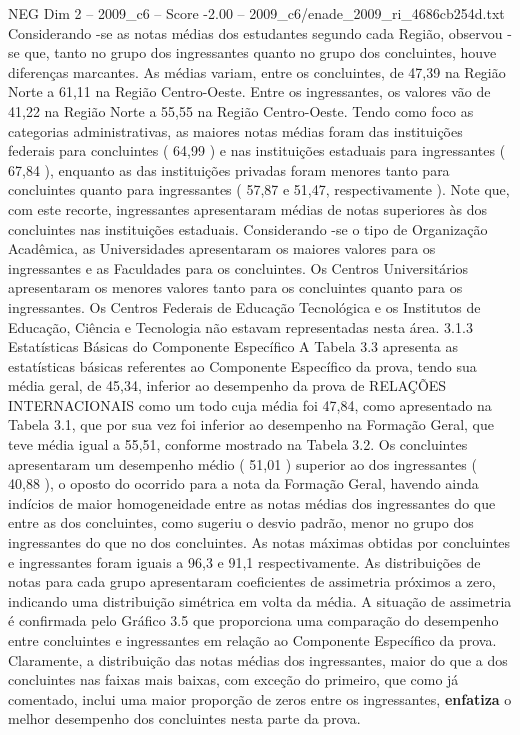 \begin{textsample}{NEG Dim 2 – 2009\_c6 – Score -2.00 – 2009\_c6/enade\_2009\_ri\_4686cb254d.txt}
Considerando -se as notas médias dos estudantes segundo cada Região, observou -se que, tanto no grupo dos ingressantes quanto no grupo dos concluintes, houve diferenças marcantes.
As médias variam, entre os concluintes, de 47,39 na Região Norte a 61,11 na Região Centro-Oeste.
Entre os ingressantes, os valores vão de 41,22 na Região Norte a 55,55 na Região Centro-Oeste.
Tendo como foco as categorias administrativas, as maiores notas médias foram das instituições federais para concluintes ( 64,99 ) e nas instituições estaduais para ingressantes ( 67,84 ), enquanto as das instituições privadas foram menores tanto para concluintes quanto para ingressantes ( 57,87 e 51,47, respectivamente ).
Note que, com este recorte, ingressantes apresentaram médias de notas superiores às dos concluintes nas instituições estaduais.
Considerando -se o tipo de Organização Acadêmica, as Universidades apresentaram os maiores valores para os ingressantes e as Faculdades para os concluintes.
Os Centros Universitários apresentaram os menores valores tanto para os concluintes quanto para os ingressantes.
Os Centros Federais de Educação Tecnológica e os Institutos de Educação, Ciência e Tecnologia não estavam representadas nesta área. 3.1.3 Estatísticas Básicas do Componente Específico A Tabela 3.3 apresenta as estatísticas básicas referentes ao Componente Específico da prova, tendo sua média geral, de 45,34, inferior ao desempenho da prova de RELAÇÕES INTERNACIONAIS como um todo cuja média foi 47,84, como apresentado na Tabela 3.1, que por sua vez foi inferior ao desempenho na Formação Geral, que teve média igual a 55,51, conforme mostrado na Tabela 3.2.
Os concluintes apresentaram um desempenho médio ( 51,01 ) superior ao dos ingressantes ( 40,88 ), o oposto do ocorrido para a nota da Formação Geral, havendo ainda indícios de maior homogeneidade entre as notas médias dos ingressantes do que entre as dos concluintes, como sugeriu o desvio padrão, menor no grupo dos ingressantes do que no dos concluintes.
As notas máximas obtidas por concluintes e ingressantes foram iguais a 96,3 e 91,1 respectivamente.
As distribuições de notas para cada grupo apresentaram coeficientes de assimetria próximos a zero, indicando uma distribuição simétrica em volta da média.
A situação de assimetria é confirmada pelo Gráfico 3.5 que proporciona uma comparação do desempenho entre concluintes e ingressantes em relação ao Componente Específico da prova.
Claramente, a distribuição das notas médias dos ingressantes, maior do que a dos concluintes nas faixas mais baixas, com exceção do primeiro, que como já comentado, inclui uma maior proporção de zeros entre os ingressantes, \textbf{enfatiza} o melhor desempenho dos concluintes nesta parte da prova.

\end{textsample}

